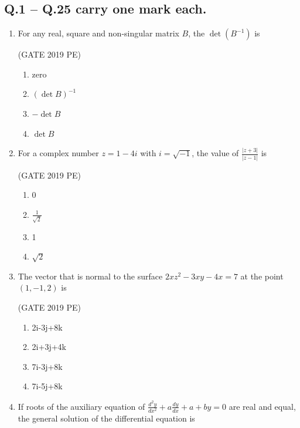 \documentclass[journal,12pt,onecolumn]{exam}
\theoremstyle{remark}
\begin{document}
\subsection*{Q.1 -- Q.25 carry one mark each.}
\begin{enumerate}
   
    \item For any real, square and non-singular matrix \( B \), the \( \det(B^{-1}) \) is

     \hfill{(GATE 2019 PE)}\\
     \begin{enumerate}
         \item zero
         \item  \((\det B)^{-1}\)
         \item \(- \det B\)
         \item \(\det B\)
     \end{enumerate}
    

    \item For a complex number \( z = 1 - 4i \) with \( i = \sqrt{-1} \), the value of \(\frac{|z+3|}{|z-1|}\) is

     \hfill{(GATE 2019 PE)}\\
     \begin{enumerate}
         \item 0
         \item \(\frac{1}{\sqrt{2}}\)
         \item 1
         \item \(\sqrt{2}\)
     \end{enumerate}
    
    \item The vector that is normal to the surface \( 2x z^{2} - 3xy - 4x = 7 \) at the point \((1, -1, 2)\) is

     \hfill{(GATE 2019 PE)}\\
    \begin{enumerate}
        \item 2i-3j+8k
        \item 2i+3j+4k
        \item 7i-3j+8k
        \item 7i-5j+8k
    \end{enumerate}

    
    \item If roots of the auxiliary equation of \(\frac{d^{2}y}{dx^{2}} + a \frac{dy}{dx} + a + by = 0\) are real and equal, the general solution of the differential equation is


\end{enumerate}
\end{document}
